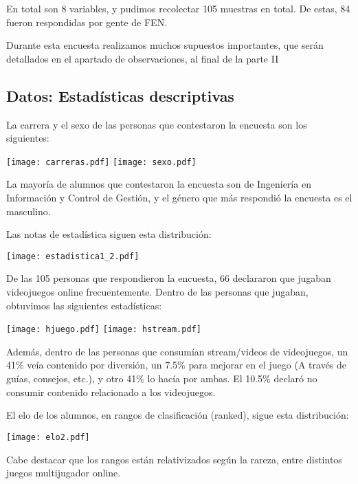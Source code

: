 \documentclass[11pt]{article}
\begin{document}
En total son 8 variables, y pudimos recolectar 105 muestras en total. De estas, 84 fueron respondidas por gente de FEN.

Durante esta encuesta realizamos muchos supuestos importantes, que serán detallados en el apartado de observaciones, al final de la parte II

\subsection{Datos: Estadísticas descriptivas}

La carrera y el sexo de las personas que contestaron la encuesta son los siguientes:


\texttt{[image: carreras.pdf]}
\texttt{[image: sexo.pdf]}

La mayoría de alumnos que contestaron la encuesta son de Ingeniería en Información y Control de Gestión, y el género que más respondió la encuesta es el masculino.


\newpage

Las notas de estadística siguen esta distribución:

\texttt{[image: estadistica1\_2.pdf]}

De las 105 personas que respondieron la encuesta, 66 declararon que jugaban videojuegos online frecuentemente. Dentro de las personas que jugaban, obtuvimos las siguientes estadísticas:

\texttt{[image: hjuego.pdf]}
\texttt{[image: hstream.pdf]}

Además, dentro de las personas que consumían stream/videos de videojuegos, un 41\% veía contenido por diversión, un 7.5\% para mejorar en el juego (A través de guías, consejos, etc.), y otro 41\% lo hacía por ambas. El 10.5\% declaró no consumir contenido relacionado a los videojuegos.

El elo de los alumnos, en rangos de clasificación (ranked), sigue esta distribución:

\begin{center}
\texttt{[image: elo2.pdf]}
\end{center}

Cabe destacar que los rangos están relativizados según la rareza, entre distintos juegos multijugador online.
\end{document}
